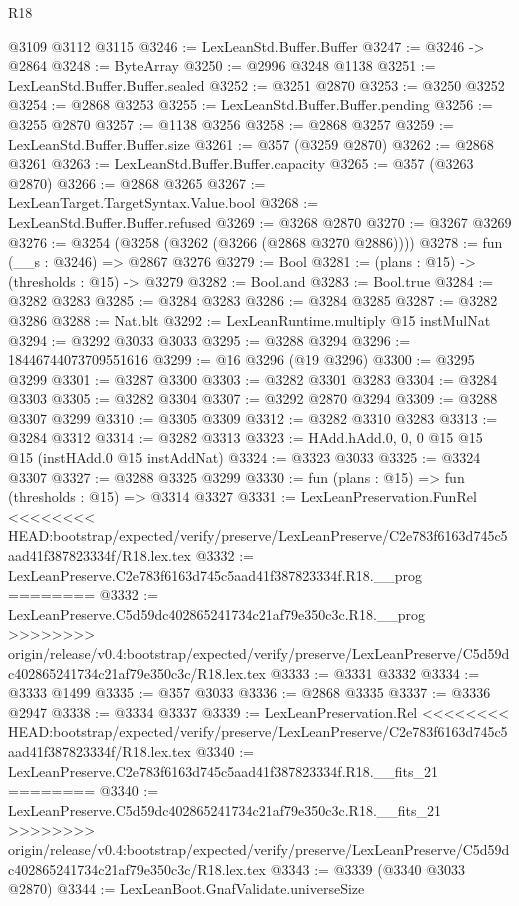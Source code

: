 \begin{lexlean}{R18}
\begin{coremodule}
{{{{{{{{{{{{{{{{{{{{{{{{{{{{{{{{{{{{{{{{{{{{{{{{{{{{{{{{{{{{{{{{{{{{{{{{{{{{{{{{{{{{{{{{{{{{{{{{{{{{{{{{{{{{{{{{{{{{{{{{{{{{{{{{{{{{{{{{{{{{{{{    @3109
    @3112
    @3115
@3246 := LexLeanStd.Buffer.Buffer
@3247 := @3246 -> @2864
@3248 := ByteArray
@3250 := @2996 @3248 @1138
@3251 := LexLeanStd.Buffer.Buffer.sealed
@3252 := @3251 @2870
@3253 := @3250 @3252
@3254 := @2868 @3253
@3255 := LexLeanStd.Buffer.Buffer.pending
@3256 := @3255 @2870
@3257 := @1138 @3256
@3258 := @2868 @3257
@3259 := LexLeanStd.Buffer.Buffer.size
@3261 := @357 (@3259 @2870)
@3262 := @2868 @3261
@3263 := LexLeanStd.Buffer.Buffer.capacity
@3265 := @357 (@3263 @2870)
@3266 := @2868 @3265
@3267 := LexLeanTarget.TargetSyntax.Value.bool
@3268 := LexLeanStd.Buffer.Buffer.refused
@3269 := @3268 @2870
@3270 := @3267 @3269
@3276 := @3254 (@3258 (@3262 (@3266 (@2868 @3270 @2886))))
@3278 := fun (__s : @3246) => @2867 @3276
@3279 := Bool
@3281 := (plans : @15) -> (thresholds : @15) -> @3279
@3282 := Bool.and
@3283 := Bool.true
@3284 := @3282 @3283
@3285 := @3284 @3283
@3286 := @3284 @3285
@3287 := @3282 @3286
@3288 := Nat.blt
@3292 := LexLeanRuntime.multiply @15 instMulNat
@3294 := @3292 @3033 @3033
@3295 := @3288 @3294
@3296 := 18446744073709551616
@3299 := @16 @3296 (@19 @3296)
@3300 := @3295 @3299
@3301 := @3287 @3300
@3303 := @3282 @3301 @3283
@3304 := @3284 @3303
@3305 := @3282 @3304
@3307 := @3292 @2870 @3294
@3309 := @3288 @3307 @3299
@3310 := @3305 @3309
@3312 := @3282 @3310 @3283
@3313 := @3284 @3312
@3314 := @3282 @3313
@3323 := HAdd.hAdd.{0, 0, 0} @15 @15 @15 (instHAdd.{0} @15 instAddNat)
@3324 := @3323 @3033
@3325 := @3324 @3307
@3327 := @3288 @3325 @3299
@3330 := fun (plans : @15) => fun (thresholds : @15) => @3314 @3327
@3331 := LexLeanPreservation.FunRel
<<<<<<<< HEAD:bootstrap/expected/verify/preserve/LexLeanPreserve/C2e783f6163d745c5aad41f387823334f/R18.lex.tex
@3332 := LexLeanPreserve.C2e783f6163d745c5aad41f387823334f.R18.__prog
========
@3332 := LexLeanPreserve.C5d59dc402865241734c21af79e350c3c.R18.__prog
>>>>>>>> origin/release/v0.4:bootstrap/expected/verify/preserve/LexLeanPreserve/C5d59dc402865241734c21af79e350c3c/R18.lex.tex
@3333 := @3331 @3332
@3334 := @3333 @1499
@3335 := @357 @3033
@3336 := @2868 @3335
@3337 := @3336 @2947
@3338 := @3334 @3337
@3339 := LexLeanPreservation.Rel
<<<<<<<< HEAD:bootstrap/expected/verify/preserve/LexLeanPreserve/C2e783f6163d745c5aad41f387823334f/R18.lex.tex
@3340 := LexLeanPreserve.C2e783f6163d745c5aad41f387823334f.R18.__fits_21
========
@3340 := LexLeanPreserve.C5d59dc402865241734c21af79e350c3c.R18.__fits_21
>>>>>>>> origin/release/v0.4:bootstrap/expected/verify/preserve/LexLeanPreserve/C5d59dc402865241734c21af79e350c3c/R18.lex.tex
@3343 := @3339 (@3340 @3033 @2870)
@3344 := LexLeanBoot.GnafValidate.universeSize
}}}}}}}}}}}}}}}}}}}}}}}}}}}}}}}}}}}}}}}}}}}}}}}}}}}}}}}}}}}}}}}}}}}}}}}}}}}}}}}}}}}}}}}}}}}}}}}}}}}}}}}}}}}}}}}}}}}}}}}}}}}}}}}}}}}}}}}}}}}}}}}
\end{coremodule}
\end{lexlean}
